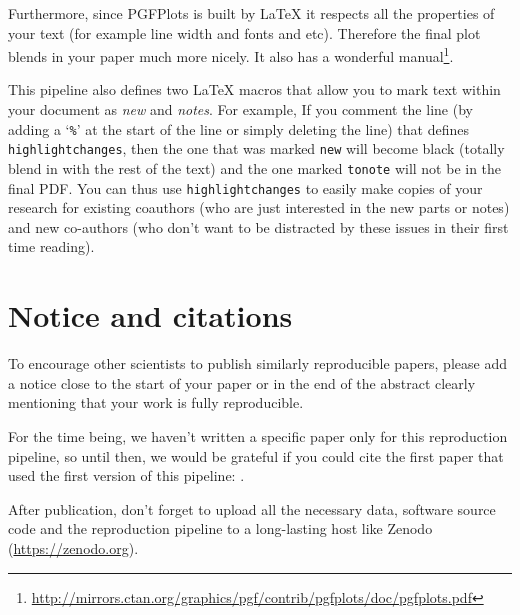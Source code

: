 \documentclass[10pt, twocolumn]{article}
\begin{document}
Furthermore, since {\small PGFP}lots is built by \LaTeX{} it respects all
the properties of your text (for example line width and fonts and
etc). Therefore the final plot blends in your paper much more nicely. It
also has a wonderful
manual\footnote{\url{http://mirrors.ctan.org/graphics/pgf/contrib/pgfplots/doc/pgfplots.pdf}}.

This pipeline also defines two \LaTeX{} macros that allow you to mark text
within your document as \emph{new} and \emph{notes}. For example,   If you comment the line (by adding a `\texttt{\%}'
at the start of the line or simply deleting the line) that defines
\texttt{highlightchanges}, then the one that was marked \texttt{new} will
become black (totally blend in with the rest of the text) and the one
marked \texttt{tonote} will not be in the final PDF. You can thus use
\texttt{highlightchanges} to easily make copies of your research for
existing coauthors (who are just interested in the new parts or notes) and
new co-authors (who don't want to be distracted by these issues in their
first time reading).

\begin{figure}[t]

\end{figure}



\section{Notice and citations}
To encourage other scientists to publish similarly reproducible papers,
please add a notice close to the start of your paper or in the end of the
abstract clearly mentioning that your work is fully reproducible.

For the time being, we haven't written a specific paper only for this
reproduction pipeline, so until then, we would be grateful if you could
cite the first paper that used the first version of this pipeline:
\citet{ai15}.

After publication, don't forget to upload all the necessary data, software
source code and the reproduction pipeline to a long-lasting host like
Zenodo (\url{https://zenodo.org}).
\end{document}
